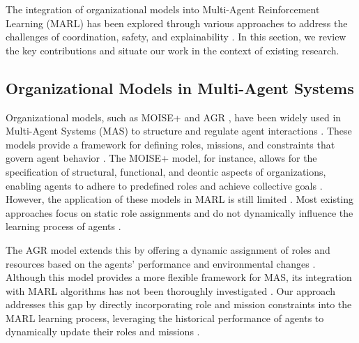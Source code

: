 \documentclass[sigconf,anonymous]{aamas}
\begin{document}
The integration of organizational models into Multi-Agent Reinforcement Learning (MARL) has been explored through various approaches to address the challenges of coordination, safety, and explainability \cite{hernandez2019survey, ghosal2021explainable}. In this section, we review the key contributions and situate our work in the context of existing research.


\subsection{Organizational Models in Multi-Agent Systems}
Organizational models, such as MOISE+ \cite{hubner2010moise} and AGR \cite{agr_reference}, have been widely used in Multi-Agent Systems (MAS) to structure and regulate agent interactions \cite{hubner2007using}. These models provide a framework for defining roles, missions, and constraints that govern agent behavior \cite{hubner2010moise, castaneda2019policy}. The MOISE+ model, for instance, allows for the specification of structural, functional, and deontic aspects of organizations, enabling agents to adhere to predefined roles and achieve collective goals \cite{hubner2010moise}. However, the application of these models in MARL is still limited \cite{hernandez2019survey}. Most existing approaches focus on static role assignments and do not dynamically influence the learning process of agents \cite{foerster2018counterfactual}.

The AGR model \cite{agr_reference} extends this by offering a dynamic assignment of roles and resources based on the agents' performance and environmental changes \cite{hernandez2019survey}. Although this model provides a more flexible framework for MAS, its integration with MARL algorithms has not been thoroughly investigated \cite{hubner2010moise}. Our approach addresses this gap by directly incorporating role and mission constraints into the MARL learning process, leveraging the historical performance of agents to dynamically update their roles and missions \cite{foerster2018counterfactual, soule2024}.

\end{document}
